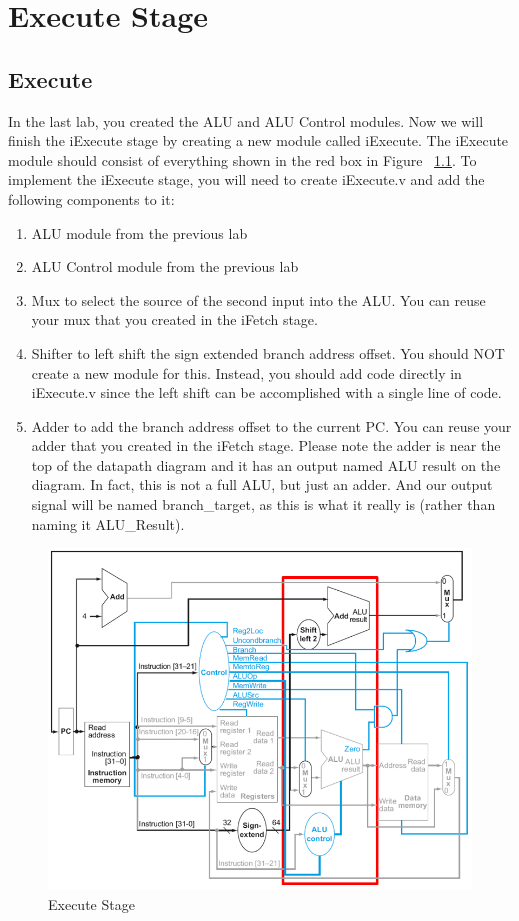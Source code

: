 \chapter{Execute Stage}

\section{Execute}

In the last lab, you created the ALU and ALU Control modules.  Now we will finish the iExecute stage by creating a new module called iExecute.  The iExecute module should consist of everything shown in the red box in Figure ~\ref{fig:execute_stage}.  To implement the iExecute stage, you will need to create iExecute.v and add the following components to it:
 
\begin{enumerate}
	\item ALU module from the previous lab
	\item ALU Control module from the previous lab	
	\item Mux to select the source of the second input into the ALU.  You can reuse your mux that you created in the iFetch stage.
	\item Shifter to left shift the sign extended branch address offset.  You should NOT create a new module for this.  Instead, you should add code directly in iExecute.v since the left shift can be accomplished with a single line of code. 
	\item Adder to add the branch address offset to the current PC.  You can reuse your adder that you created in the iFetch stage.  Please note the adder is near the top of the datapath diagram and it has an output named ALU result on the diagram.  In fact, this is not a full ALU, but just an adder.  And our output signal will be named branch\_target, as this is what it really is (rather than naming it ALU\_Result).
\end{enumerate} 

\begin{figure}
	\caption{Execute Stage}\label{fig:execute_stage}
	\begin{center}
		\includegraphics[width=4.75in]{../images/execute_stage.png}
	\end{center}
\end{figure} 


